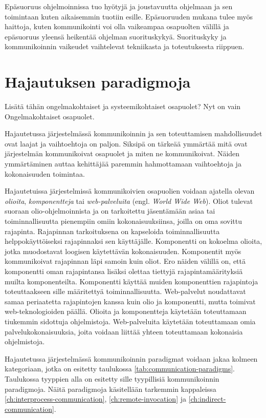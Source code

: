 Epäsuoruus ohjelmoinnissa tuo hyötyjä ja joustavuutta ohjelmaan ja sen toimintaan kuten aikaisemmin tuotiin esille. Epäsuoruuden mukana tulee myös haittoja, kuten kommunikointi voi olla vaikeampaa osapuolten välillä ja epäsuoruus yleensä heikentää ohjelman suorituskykyä. Suorituskyky ja kommunikoinnin vaikeudet vaihtelevat tekniikasta ja toteutuksesta riippuen.

\section{Hajautuksen paradigmoja}
\begin{it}
	Lisätä tähän ongelmakohtaiset ja systeemikohtaiset osapuolet? Nyt on vain Ongelmakohtaiset osapuolet.
\end{it}
Hajautetussa järjestelmässä kommunikoinnin ja sen toteuttamisen mahdollisuudet ovat laajat ja vaihtoehtoja on paljon. Siksipä on tärkeää ymmärtää mitä ovat järjestelmän kommunikoivat osapuolet ja miten ne kommunikoivat. Näiden ymmärtäminen auttaa kehittäjää paremmin hahmottamaan vaihtoehtoja ja kokonaisuuden toimintaa.

Hajautetuissa järjestelmissä kommunikoivien osapuolien voidaan ajatella olevan \emph{olioita}, \emph{komponentteja} tai \emph{web-palveluita} (engl. \emph{World Wide Web}). Oliot tulevat suoraan olio-ohjelmoinnista ja on tarkoitettu jäsentämään asiaa tai toiminnallisuutta pienempiin omiin kokonaisuuksiinsa, joilla on oma sovittu rajapinta. Rajapinnan tarkoituksena on kapseloida toiminnallisuutta helppokäyttöiseksi rajapinnaksi sen käyttäjälle. Komponentti on kokoelma olioita, jotka muodostavat loogisen käytettävän kokonaisuuden. Komponentit myös kommunikoivat rajapinnan läpi samoin kuin oliot. Ero näiden välillä on, että komponentti oman rajapintansa lisäksi olettaa tiettyjä rajapintamäärityksiä muilta komponenteilta. Komponentti käyttää muiden komponenttien rajapintoja toteuttaakseen sille määritettyä toiminnallisuutta. Web-palvelut noudattavat samaa periaatetta rajapintojen kanssa kuin olio ja komponentti, mutta toimivat web-teknologioiden päällä. Olioita ja komponentteja käytetään toteuttamaan tiukemmin sidottuja ohjelmistoja. Web-palveluita käytetään toteuttamaan omia palvelukokonaisuuksia, joita voidaan liittää yhteen toteuttamaan kokonaisia ohjelmistoja. \mbox{\cite[s.~42--43]{distributed-systems-concepts-and-design}}

Hajautetussa järjestelmässä kommunikoinnin paradigmat voidaan jakaa kolmeen kategoriaan, jotka on esitetty taulukossa \ref{tab:communication-paradigms}. Taulukossa tyyppien alla on esitetty sille tyypillisiä kommunikoinnin paradigmoja. Näitä paradigmoja käsitellään tarkemmin kappaleissa \ref{ch:interprocess-communication}, \ref{ch:remote-invocation} ja \ref{ch:indirect-communication}.


